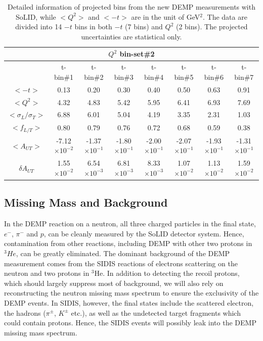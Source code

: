 \begin{table}[!ht]
\begin{tabular}{|c|c|c|c|c|c|c|c|}
\multicolumn{8}{|c|}{$Q^{2}$ bin-set\#2 } \\
\hline
      &  t-bin\#1 & t-bin\#2 & t-bin\#3 & t-bin\#4 & t-bin\#5 & t-bin\#6 & t-bin\#7 \\
  \hline
$<-t>$     &  0.13 &  0.20 & 0.30 & 0.40 & 0.50 & 0.63 & 0.91 \\
$<Q^{2}>$   &  4.32 &  4.83 & 5.42 & 5.95 & 6.41 & 6.93 & 7.69 \\
$<\sigma_{L}/\sigma_{T}>$   &  6.88 &  6.01 & 5.04 & 4.19 & 3.35 & 2.31 & 1.03 \\
$<f_{L/T}>$     &  0.80 &  0.79 & 0.76 & 0.72 & 0.68 & 0.59 & 0.38 \\
$<A_{UT}>$   &  -7.12$\times 10^{-2}$ &  -1.37$\times 10^{-1}$ & -1.80$\times 10^{-1}$ & -2.00$\times 10^{-1}$ & -2.07$\times 10^{-1}$ & -1.93$\times 10^{-1}$ & -1.31$\times 10^{-1}$ \\
$\delta A_{UT}$   &  1.55$\times 10^{-2}$ &  6.54$\times 10^{-3}$ & 6.81$\times 10^{-3}$ & 8.33$\times 10^{-3}$ & 1.07$\times 10^{-2}$ & 1.13$\times 10^{-2}$ & 1.59$\times 10^{-2}$ \\
\hline
\end{tabular}
\caption[Detailed information of projected bins]{\footnotesize{Detailed
information of projected bins from the new DEMP measurements with SoLID, while
$<Q^{2}>$ and $<-t>$ are in the unit of GeV$^{2}$. The data are
divided into 14 $-t$ bins in both $-t$ (7 bins) and $Q^{2}$ (2 bins).  The
projected uncertainties are statistical only.}}
\label{asym_bin_table}
\end{table} 

\subsection{Missing Mass and Background}

In the DEMP reaction on a neutron, all three charged particles in the final
state, $e^{-}$, $\pi^{-}$ and $p$, can be cleanly measured by the SoLID detector
system.  Hence, contamination from other reactions, including
DEMP with other two protons in $^{3}He$, can be greatly eliminated.  The
dominant background of the DEMP measurement comes from the SIDIS reactions of
electrons scattering on the neutron and two protons in $\mathrm{^{3}He}$. In
addition to detecting the recoil protons, which should largely suppress most of
background, we will also rely on reconstructing the neutron missing mass
spectrum to ensure the exclusivity of the DEMP events. In SIDIS, however, the
final states include the scattered electron, the hadrons ($\pi^{\pm}$,
$K^{\pm}$ etc.), as well as the undetected target fragments which could contain
protons. Hence, the SIDIS events will possibly leak into the DEMP missing mass
spectrum.


